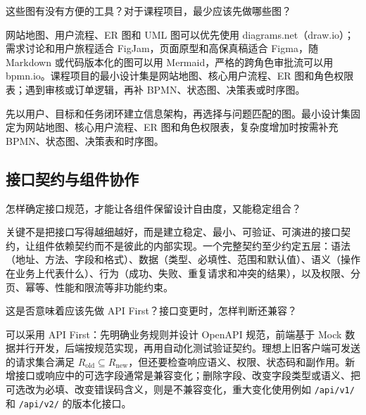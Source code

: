 \documentclass[UTF8,a4paper,11pt]{ctexart}
\begin{document}
\begin{membermsg}
这些图有没有方便的工具？对于课程项目，最少应该先做哪些图？
\end{membermsg}

\begin{gptmsg}
网站地图、用户流程、ER 图和 UML 图可以优先使用 diagrams.net（draw.io）；需求讨论和用户旅程适合 FigJam，页面原型和高保真稿适合 Figma，随 Markdown 或代码版本化的图可以用 Mermaid，严格的跨角色审批流可以用 bpmn.io。课程项目的最小设计集是网站地图、核心用户流程、ER 图和角色权限表；遇到审核或订单逻辑，再补 BPMN、状态图、决策表或时序图。
\end{gptmsg}

\begin{decisionbox}
先以用户、目标和任务闭环建立信息架构，再选择与问题匹配的图。最小设计集固定为网站地图、核心用户流程、ER 图和角色权限表，复杂度增加时按需补充 BPMN、状态图、决策表和时序图。
\end{decisionbox}

\subsection{接口契约与组件协作}

\begin{membermsg}
怎样确定接口规范，才能让各组件保留设计自由度，又能稳定组合？
\end{membermsg}

\begin{gptmsg}
关键不是把接口写得越细越好，而是建立稳定、最小、可验证、可演进的接口契约，让组件依赖契约而不是彼此的内部实现。一个完整契约至少约定五层：语法（地址、方法、字段和格式）、数据（类型、必填性、范围和默认值）、语义（操作在业务上代表什么）、行为（成功、失败、重复请求和冲突的结果），以及权限、分页、幂等、性能和限流等非功能约束。
\end{gptmsg}

\begin{membermsg}
这是否意味着应该先做 API First？接口变更时，怎样判断还兼容？
\end{membermsg}

\begin{gptmsg}
可以采用 API First：先明确业务规则并设计 OpenAPI 规范，前端基于 Mock 数据并行开发，后端按规范实现，再用自动化测试验证契约。理想上旧客户端可发送的请求集合满足 $R_{\mathrm{old}}\subseteq R_{\mathrm{new}}$，但还要检查响应语义、权限、状态码和副作用。新增接口或响应中的可选字段通常是兼容变化；删除字段、改变字段类型或语义、把可选改为必填、改变错误码含义，则是不兼容变化，重大变化使用例如 \texttt{/api/v1/} 和 \texttt{/api/v2/} 的版本化接口。
\end{gptmsg}
\end{document}
